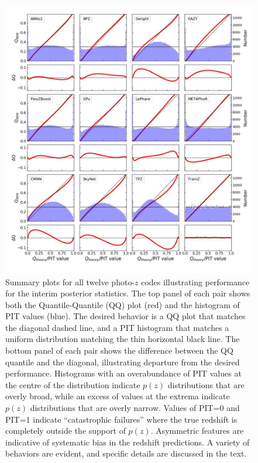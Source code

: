 \begin{figure}
\centering
\includegraphics[width=\textwidth]{fig/PITANDQQplot_12codes_crop.jpg}
\caption{Summary plots for all twelve photo-$z$ codes illustrating performance for the interim posterior statistics. The top panel of each pair shows both the Quantile-Quantile (QQ) plot (red) and the histogram of PIT values (blue).  The desired behavior is a QQ plot that matches the diagonal dashed line, and a PIT histogram that matches a uniform distribution matching the thin horizontal black line.  The bottom panel of each pair shows the difference between the QQ quantile and the diagonal, illustrating departure from the desired performance.  Histograms with an overabundance of PIT values at the centre of the distribution indicate $p(z)$ distributions that are overly broad, while an excess of values at the extrema indicate $p(z)$ distributions that are overly narrow.  Values of PIT=0 and PIT=1 indicate ``catastrophic failures'' where the true redshift is completely outside the support of $p(z)$.  Asymmetric features are indicative of systematic bias in the redshift predictions.  A variety of behaviors are evident, and specific details are discussed in the text.}
\label{fig:pitqq}
\end{figure}

